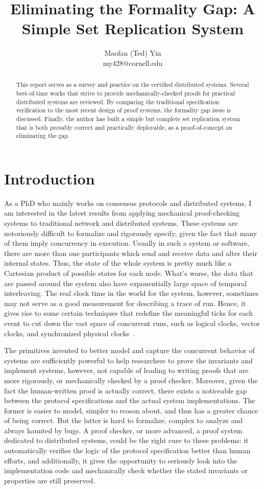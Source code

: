 \documentclass[twocolumn]{article}
\title{Eliminating the Formality Gap: A Simple Set Replication System}
\author{Maofan (Ted) Yin\\my428@cornell.edu}
\begin{document}
\maketitle

\begin{abstract}
    This report serves as a survey and practice on the certified distributed
    systems.  Several best-of-time works that strive to provide
    mechanically-checked proofs for practical distributed systems are reviewed.
    By comparing the traditional specification verification to the most recent
    design of proof systems, the formality gap issue is discussed.  Finally,
    the author has built a simple but complete set replication system that is
    both provably correct and practically deployable, as a proof-of-concept on
    eliminating the gap.
\end{abstract}
\section{Introduction}
As a PhD who mainly works on consensus protocols and distributed systems, I am
interested in the latest results from applying mechanical proof-checking
systems to traditional network and distributed systems. These systems are
notoriously difficult to formalize and rigorously specify, given the fact that
many of them imply concurrency in execution. Usually in such a system or
software, there are more than one participants which send and receive data and
alter their internal states. Thus, the state of the whole system is pretty much
like a Cartesian product of possible states for each node. What's
worse, the data that are passed around the system also have exponentially large
space of temporal interleaving. The real clock time in the world for the
system, however, sometimes may not serve as a good measurement for describing a
trace of run.  Hence, it gives rise to some certain techniques that redefine
the meaningful ticks for each event to cut down the vast space of concurrent
runs, such as logical clocks, vector clocks, and synchronized physical
clocks~\cite{lamport1978time}.

The primitives invented to better model and capture the concurrent behavior of
systems are sufficiently powerful to help researchers to prove the invariants
and implement systems, however, not capable of leading to writing proofs that
are more rigorously, or mechanically checked by a proof checker. Moreover,
given the fact the human-written proof is actually correct, there exists a
noticeable gap between the protocol specifications and the actual system
implementations. The former is easier to model, simpler to reason about, and
thus has a greater chance of being correct. But the latter is hard to
formalize, complex to analyze and always haunted by bugs. A proof checker,
or more advanced, a proof system dedicated to distributed systems, could be the
right cure to these problems: it automatically verifies the logic of the
protocol specification better than human efforts, and additionally, it gives
the opportunity to seriously look into the implementation code and mechanically
check whether the stated invariants or properties are still preserved.
\end{document}
